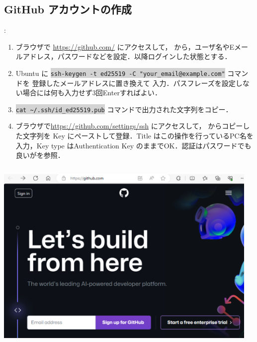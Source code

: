 \documentclass[aspectratio=169,dvipdfmx,cjk]{beamer}
\newcommand{\cmdline}[1]{
    \colorbox{lightgray}{\lstinline[style=command]{#1}}
}
\newcommand{\blue}[1]{ {\color{blue} #1} }
\begin{document}
\subsection{GitHub アカウントの作成}
\begin{frame}{\insertsection \thesubsection: \insertsubsection}
  \begin{enumerate}
    \item ブラウザで \href{https://github.com/}{https://github.com/} にアクセスして， から，ユーザ名やEメールアドレス，パスワードなどを設定\cite{GitHubAccount}．以降ログインした状態とする．
    \item Ubuntu に\cmdline{ssh-keygen -t ed25519 -C "your_email@example.com"} コマンドを\blue{登録したメールアドレスに置き換えて}入力．パスフレーズを設定しない場合には何も入力せず3回Enterすればよい\cite{GitHubSSH}．
    \item \cmdline{cat ~/.ssh/id_ed25519.pub} コマンドで出力された文字列をコピー．
    \item ブラウザで\href{https://github.com/settings/ssh}{https://github.com/settings/ssh} にアクセスして， からコピーした文字列を Key にペーストして登録\cite{GitHubAccount}．Title はこの操作を行っているPC名を入力，Key type はAuthentication Key のままでOK．認証はパスワードでも良いが\cite{GitHubAuthentication}を参照．
  \end{enumerate}
  \begin{columns}
    \begin{column}{0.25\textwidth}
        \includegraphics[width=1.0\linewidth]{fig/github.png}
    \end{column}
    \begin{column}{0.25\textwidth}

\end{column}
\end{columns}
\end{frame}
\end{document}
